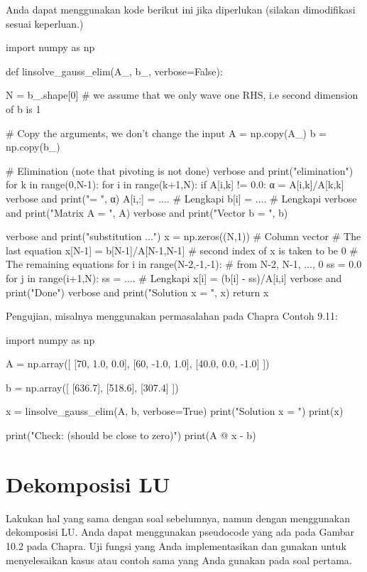 Anda dapat menggunakan kode berikut ini jika diperlukan (silakan dimodifikasi sesuai
keperluan.)
\begin{pythoncode}
import numpy as np

def linsolve_gauss_elim(A_, b_, verbose=False):

    N = b_.shape[0]
    # we assume that we only wave one RHS, i.e second dimension of b is 1

    # Copy the arguments, we don't change the input
    A = np.copy(A_)
    b = np.copy(b_)
    
    # Elimination (note that pivoting is not done)
    verbose and print("\nForward elimination")
    for k in range(0,N-1):
        for i in range(k+1,N):
            if A[i,k] != 0.0:
                α = A[i,k]/A[k,k]
                verbose and print(" = ", α)
                A[i,:] = .... # Lengkapi
                b[i]   = .... # Lengkapi
            verbose and print("Matrix A = \n", A)
            verbose and print("Vector b = \n", b)
    
    verbose and print("\nBack substitution ...")
    x = np.zeros((N,1)) # Column vector
    # The last equation
    x[N-1] = b[N-1]/A[N-1,N-1] # second index of x is taken to be 0
    # The remaining equations
    for i in range(N-2,-1,-1): # from N-2, N-1, ..., 0
        ss = 0.0
        for j in range(i+1,N):
            ss = .... # Lengkapi
        x[i] = (b[i] - ss)/A[i,i]
    verbose and print("Done")
    verbose and print("Solution x = \n", x)
    return x    
\end{pythoncode}

Pengujian, misalnya menggunakan permasalahan pada Chapra Contoh 9.11:
\begin{pythoncode}
import numpy as np
    
A = np.array([
    [70, 1.0, 0.0],
    [60, -1.0, 1.0],
    [40.0, 0.0, -1.0]
])
    
b = np.array([
    [636.7],
    [518.6],
    [307.4]
])
    
x = linsolve_gauss_elim(A, b, verbose=True)
print("Solution x = ")
print(x)
    
print("Check: (should be close to zero)")
print(A @ x - b)
\end{pythoncode}

\section{Dekomposisi LU}

\begin{soal}
Lakukan hal yang sama dengan soal sebelumnya, namun dengan menggunakan
dekomposisi LU.
Anda dapat menggunakan pseudocode yang ada pada Gambar 10.2 pada Chapra.
Uji fungsi yang Anda implementasikan dan gunakan untuk menyelesaikan
kasus atau contoh sama yang Anda gunakan pada soal pertama.
\end{soal}


